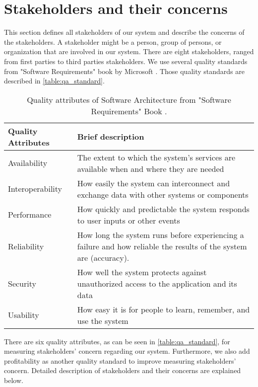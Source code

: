 \section{Stakeholders and their concerns}



This section defines all stakeholders of our system and describe the concerns of the stakeholders. A stakeholder might be a person, group of persons, or organization that are involved in our system. There are eight stakeholders, ranged from first parties to third parties stakeholders. We use several quality standards from "Software Requirements" book by Microsoft \cite{wiegers2013software}. Those quality standards are described in \autoref{table:qa_standard}.

\begin{table}[!htbp] \centering
    \caption{Quality attributes of Software Architecture from "Software Requirements" Book \cite{wiegers2013software}.}
    \label{table:qa_standard}
    \begin{tabular}{L{} L{}}
    \toprule
    \textbf{Quality Attributes} & \textbf{Brief description} \\ \midrule
    Availability & The extent to which the system's services are available when and where they are needed\\
    Interoperability & How easily the system can interconnect and exchange data with other systems or components\\
    Performance & How quickly and predictable the system responds to user inputs or other events\\
    Reliability & How long the system runs before experiencing a failure and how reliable the results of the system are (accuracy). \\
    Security & How well the system protects against unauthorized access to the application and its data\\
    Usability & How easy it is for people to learn, remember, and use the system\\
    \bottomrule
    \end{tabular}
\end{table}

There are six quality attributes, as can be seen in \autoref{table:qa_standard}, for measuring stakeholders' concern regarding our system. Furthermore, we also add profitability as another quality standard to improve measuring stakeholders' concern. Detailed description of stakeholders and their concerns are explained below.

